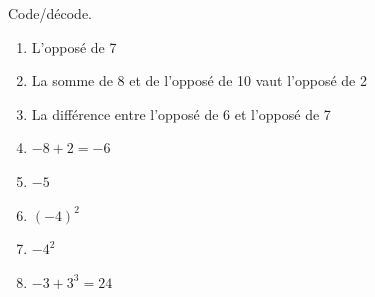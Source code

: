 %
%
    Code/décode.
    \begin{enumerate}[cols=2]
        \item L'opposé de 7
        \item La somme de 8 et de l'opposé de 10 vaut l'opposé de 2
        \item La différence entre l'opposé de 6 et l'opposé de 7
        \item $-8+2=-6$
        \item $-5$
        \item $(-4)^2$
        \item $-4^2$
        \item $-3+3^3=24$
    \end{enumerate}
